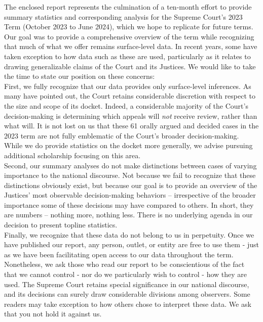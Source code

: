 
\large
\noindent The enclosed report represents the culmination of a ten-month effort to provide summary statistics and corresponding analysis for the Supreme Court's 2023 Term (October 2023 to June 2024), which we hope to replicate for future terms. \\

\noindent Our goal was to provide a comprehensive overview of the term while recognizing that much of what we offer remains surface-level data. In recent years, some have taken exception to how data such as these are used, particularly as it relates to drawing generalizable claims of the Court and its Justices. We would like to take the time to state our position on these concerns: \\

\noindent First, we fully recognize that our data provides only surface-level inferences. As many have pointed out, the Court retains considerable discretion with respect to the size and scope of its docket. Indeed, a considerable majority of the Court's decision-making is determining which appeals will \emph{not} receive review, rather than what will. It is not lost on us that these 61 orally argued and decided cases in the 2023 term are not fully emblematic of the Court's broader decision-making. While we do provide statistics on the docket more generally, we advise pursuing additional scholarship focusing on this area.\\

\noindent Second, our summary analyses do not make distinctions between cases of varying importance to the national discourse. Not because we fail to recognize that these distinctions obviously exist, but because our goal is to provide an overview of the Justices' most observable decision-making behaviors -- irrespective of the broader importance some of these decisions may have compared to others. In short, they are numbers -- nothing more, nothing less. There is no underlying agenda in our decision to present topline statistics. \\

\noindent Finally, we recognize that these data do not belong to us in perpetuity. Once we have published our report, any person, outlet, or entity are free to use them - just as we have been facilitating open access to our data throughout the term. Nonetheless, we ask those who read our report to be conscientious of the fact that we cannot control - nor do we particularly wish to control - how they are used. The Supreme Court retains special significance in our national discourse, and its decisions can surely draw considerable divisions among observers. Some readers may take exception to how others chose to interpret these data. We ask that you not hold it against us. \\


